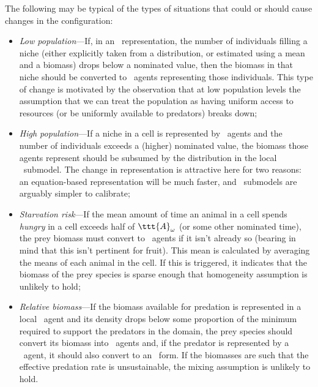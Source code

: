 The following may be typical of the types of situations that could or
should cause changes in the con\-fig\-ur\-a\-tion:
\begin{itemize}
  \item \emph{Low population}---If, in an \SD\ representa\-tion,
    the number of in\-di\-vidu\-als filling a niche (either explicitly taken
    from a distribution, or estimated using a mean and a biomass)
    drops below a nominated value, then the biomass in that niche
    should be converted to \IB\ agents representing those
    in\-di\-vidu\-als. This type of change is motivated by the observation
    that at low population levels the assumption that we can treat the
    population as having uniform access to resources (or be uniformly
    available to predators) breaks down;

  \item \emph{High population}---If a niche in a cell is
    represented by \IB\ agents and the number of in\-di\-vidu\-als exceeds a
    (higher) nominated value, the biomass those agents represent
    should be subsumed by the distribution in the local
    \SD\ submodel. The change in rep\-re\-sen\-ta\-tion is attractive here for
    two reasons: an equation-based rep\-re\-sen\-ta\-tion will be much faster,
    and \SD\ submodels are arguably simpler to calibrate;

  \item \emph{Starvation risk}---If the mean amount of time an
    animal in a cell spends \emph{hungry} in a cell exceeds half of
    $\ttt{A}_\omega$ (or some other nominated time), the prey biomass
    must convert to \IB\ agents if it isn't already so (bearing in
    mind that this isn't pertinent for fruit). This mean is calculated
    by averaging the means of each animal in the cell. If this is
    triggered, it indicates that the biomass of the prey species is
    sparse enough that homogeneity assumption is unlikely to hold;

  \item \emph{Relative biomass}---If the biomass available for
    predation is represented in a local \SD\ agent and its density
    drops below some proportion of the minimum required to support the
    predators in the domain, the prey species should convert its
    biomass into \IB\ agents and, if the predator is represented by a
    \SD\ agent, it should also convert to an \IB\ form. If the
    biomasses are such that the effective predation rate is
    unsustainable, the mixing assumption is unlikely to hold.
\end{itemize}


